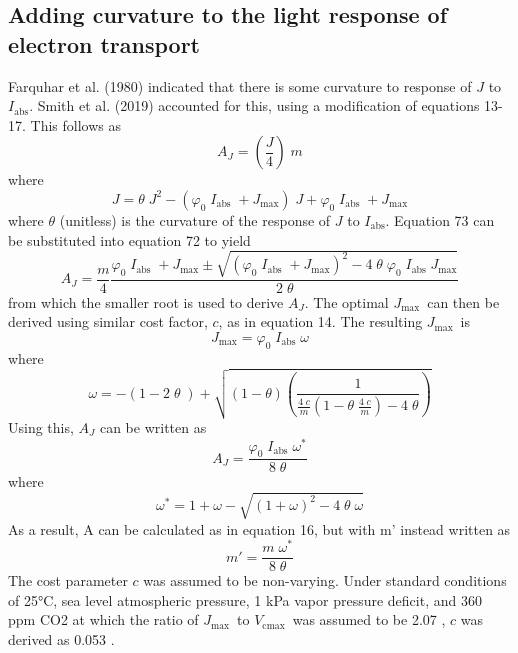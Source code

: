 \documentclass{myreport}
\newcommand{\vcmax}{$V_{\text{cmax}}$}
\newcommand{\jmax}{$J_{\text{max}}$}
\begin{document}
\subsection{Adding curvature to the light response of electron transport}
Farquhar et al. (1980) indicated that there is some curvature to response of $J$ to 
$I_{\mathrm{abs}}$. Smith et al. (2019) accounted for this, using a modification of
equations 13-17. This follows as
\begin{equation}
    A_J = \left(\frac{J}{4} \right) \; m
\end{equation}
where
\begin{equation}
    J = \theta \; J^2 - 
    \left(
    \varphi_0 \; I_{\mathrm{abs}} \; + J_{\mathrm{max}}
    \right) \; J +
     \varphi_0 \; I_{\mathrm{abs}} \; + J_{\mathrm{max}}    
\end{equation}
where $\theta$ (unitless) is the curvature of the response of $J$ to $I_{\mathrm{abs}}$.
Equation 73 can be substituted into equation 72 to yield
\begin{equation}
    A_J = \frac{m}{4}
    \frac{\varphi_0 \; I_{\mathrm{abs}} \; + J_{\mathrm{max}} \pm 
    \sqrt{
    \left(\varphi_0 \; I_{\mathrm{abs}} \; + J_{\mathrm{max}} \right)^2 -
    4 \; \theta \; \varphi_0 \; I_{\mathrm{abs}} \; J_{\mathrm{max}}}}
    {2 \; \theta}
\end{equation}
from which the smaller root is used to derive $A_J$.
The optimal \jmax\ can then be derived using similar cost factor, $c$, as in equation
14. The resulting \jmax\ is
\begin{equation}
    J_{\mathrm{max}} = \varphi_0 \; I_{\mathrm{abs}} \; \omega
\end{equation}
where
\begin{equation}
    \omega = - \left(1 - 2 \; \theta \; \right) +
    \sqrt{\left(1 - \theta \right)
    \left(
    \frac{1}{
    \frac{4 \; c}{m}
    \left(1 - \theta \;
    \frac{4 \; c}{m}\right)
    - 4 \; \theta}\right)}
\end{equation}
Using this, $A_J$ can be written as
\begin{equation}
    A_J = \frac{\varphi_0 \; I_{\mathrm{abs}} \; \omega^{\ast}}
    {8 \; \theta}
\end{equation}
where
\begin{equation}
    \omega^{\ast} = 1 + \omega - \sqrt{\left(1 + \omega \right)^2 -
    4 \; \theta \; \omega}
\end{equation}
As a result, A can be calculated as in equation 16, but with m' instead written as
\begin{equation}
    m' = \frac{m \; \omega^{\ast}}{8 \; \theta}
\end{equation}
The cost parameter $c$ was assumed to be non-varying. Under
standard conditions of 25°C, sea level atmospheric pressure, 1 kPa vapor pressure 
deficit, and 360 ppm CO2 at which
the ratio of \jmax\ to \vcmax\ was assumed to be 2.07 \citep{smithdukes17}, $c$ was derived as 0.053 \citep{smith19ecollett}.
\end{document}
